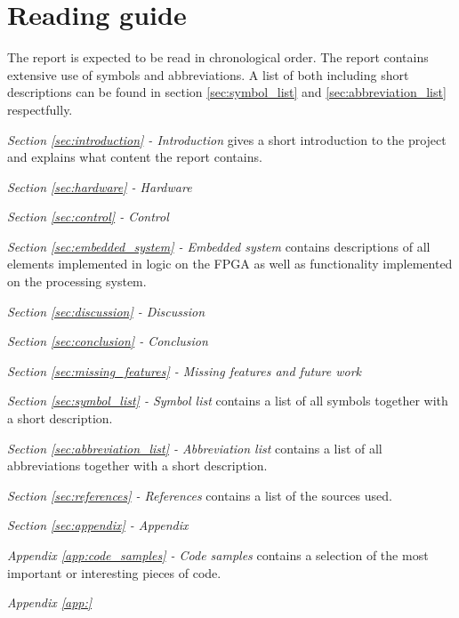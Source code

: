 \section{Reading guide}
The report is expected to be read in chronological order. The report contains extensive use of symbols and abbreviations. A list of both including short descriptions can be found in section \ref{sec:symbol_list} and \ref{sec:abbreviation_list} respectfully. 

\medskip
\emph{Section \ref{sec:introduction} - Introduction} gives a short introduction to the project and explains what content the report contains.

\medskip
\emph{Section \ref{sec:hardware} - Hardware} 

\medskip
\emph{Section \ref{sec:control} - Control} 

\medskip
\emph{Section \ref{sec:embedded_system} - Embedded system} contains descriptions of all elements implemented in logic on the FPGA as well as functionality implemented on the processing system. 

\medskip
\emph{Section \ref{sec:discussion} - Discussion} 

\medskip
\emph{Section \ref{sec:conclusion} - Conclusion} 

\medskip
\emph{Section \ref{sec:missing_features} - Missing features and future work} 

\medskip
\emph{Section \ref{sec:symbol_list} - Symbol list} contains a list of all symbols together with a short description.

\medskip
\emph{Section \ref{sec:abbreviation_list} - Abbreviation list} contains a list of all abbreviations together with a short description.

\medskip
\emph{Section \ref{sec:references} - References} contains a list of the sources used.


\medskip
\emph{Section \ref{sec:appendix} - Appendix} 

\quad \textit{Appendix \ref{app:code_samples} - Code samples} contains a selection of the most important or interesting pieces of code.

\quad \textit{Appendix \ref{app:}} 
